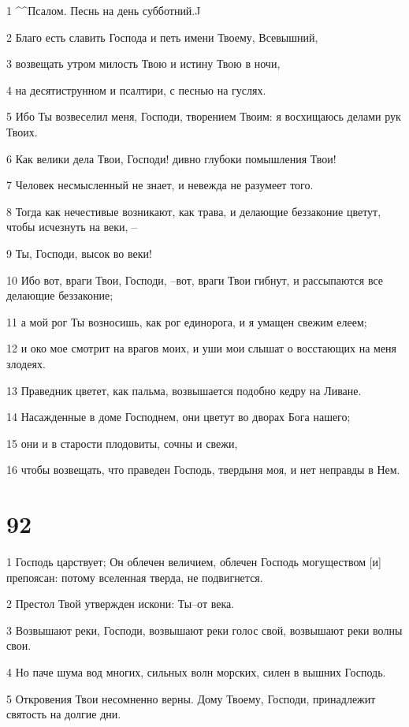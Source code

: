 \par 1 ^^Псалом. Песнь на день субботний.^^
\par 2 Благо есть славить Господа и петь имени Твоему, Всевышний,
\par 3 возвещать утром милость Твою и истину Твою в ночи,
\par 4 на десятиструнном и псалтири, с песнью на гуслях.
\par 5 Ибо Ты возвеселил меня, Господи, творением Твоим: я восхищаюсь делами рук Твоих.
\par 6 Как велики дела Твои, Господи! дивно глубоки помышления Твои!
\par 7 Человек несмысленный не знает, и невежда не разумеет того.
\par 8 Тогда как нечестивые возникают, как трава, и делающие беззаконие цветут, чтобы исчезнуть на веки, --
\par 9 Ты, Господи, высок во веки!
\par 10 Ибо вот, враги Твои, Господи, --вот, враги Твои гибнут, и рассыпаются все делающие беззаконие;
\par 11 а мой рог Ты возносишь, как рог единорога, и я умащен свежим елеем;
\par 12 и око мое смотрит на врагов моих, и уши мои слышат о восстающих на меня злодеях.
\par 13 Праведник цветет, как пальма, возвышается подобно кедру на Ливане.
\par 14 Насажденные в доме Господнем, они цветут во дворах Бога нашего;
\par 15 они и в старости плодовиты, сочны и свежи,
\par 16 чтобы возвещать, что праведен Господь, твердыня моя, и нет неправды в Нем.

\chapter{92}

\par 1 Господь царствует; Он облечен величием, облечен Господь могуществом [и] препоясан: потому вселенная тверда, не подвигнется.
\par 2 Престол Твой утвержден искони: Ты--от века.
\par 3 Возвышают реки, Господи, возвышают реки голос свой, возвышают реки волны свои.
\par 4 Но паче шума вод многих, сильных волн морских, силен в вышних Господь.
\par 5 Откровения Твои несомненно верны. Дому Твоему, Господи, принадлежит святость на долгие дни.

